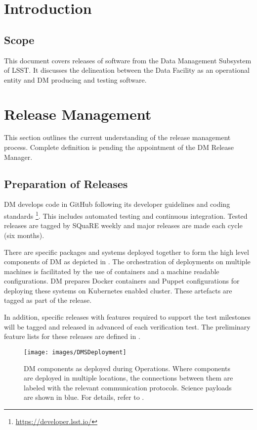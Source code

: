 \section{Introduction}
\subsection{Scope}

This document covers releases of software from the Data Management Subsystem of LSST.
It discusses the delineation between the Data Facility as an operational entity and DM producing and testing software.

\section{Release Management}\label{sect:relman}

This section outlines the current understanding of the release management process.
Complete definition is pending the appointment of the DM Release Manager.

\subsection{Preparation of Releases}\label{sect:relprep}

DM develops code in GitHub following its developer guidelines and coding standards \footnote{\url{https://developer.lsst.io/}}.
This includes automated testing and continuous integration.
Tested releases are tagged by SQuaRE weekly and major releases are made each cycle (six months).

There are specific packages and systems deployed together to form the high level components of DM as depicted in .
The orchestration of deployments on multiple machines is facilitated by the use of containers and a machine readable configurations.
DM prepares Docker containers and Puppet configurations for deploying these systems on Kubernetes enabled cluster.
These artefacts are tagged as part of the release.

In addition, specific releases with features required to support the  test milestones will be tagged and released in advanced of each verification test.
The preliminary feature lists for these releases are defined in .

\begin{figure}[htbp]
        \begin{center}
                \texttt{[image: images/DMSDeployment]}
                \caption{DM components as deployed during Operations.
                         Where components are deployed in multiple locations, the connections between them are labeled with the relevant communication protocols.
                         Science payloads are shown in blue.
                         For details, refer to .
                \label{fig:dmsdeploy}}
        \end{center}
\end{figure}

